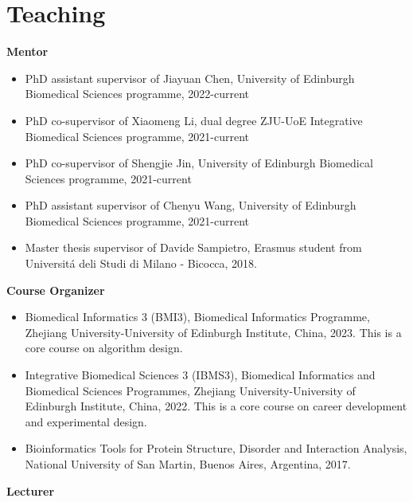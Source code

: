 \documentclass[11pt,a4paper,sans]{moderncv} %
\begin{document}
\section{Teaching}
\vspace{-.1cm}
\textbf{Mentor}
\begin{itemize}
  \item PhD assistant supervisor of Jiayuan Chen, University of Edinburgh Biomedical Sciences programme, 2022-current
  \item PhD co-supervisor of Xiaomeng Li, dual degree ZJU-UoE Integrative Biomedical Sciences programme, 2021-current
  \item PhD co-supervisor of Shengjie Jin, University of Edinburgh Biomedical Sciences programme, 2021-current
  \item PhD assistant supervisor of Chenyu Wang, University of Edinburgh Biomedical Sciences programme, 2021-current
  \item Master thesis supervisor of Davide Sampietro, Erasmus student from Universit\'a deli Studi di Milano - Bicocca, 2018.
\end{itemize}
\vspace{.1cm}
\textbf{Course Organizer}
\begin{itemize}
  \item Biomedical Informatics 3 (BMI3), Biomedical Informatics Programme, Zhejiang University-University of Edinburgh Institute, China, 2023. This is a core course on algorithm design.
  \item Integrative Biomedical Sciences 3 (IBMS3), Biomedical Informatics and Biomedical Sciences Programmes, Zhejiang University-University of Edinburgh Institute, China, 2022. This is a core course on career development and experimental design.
  \item Bioinformatics Tools for Protein Structure, Disorder and Interaction Analysis, National University of San Martin, Buenos Aires, Argentina, 2017.
\end{itemize}
\vspace{.1cm}
\textbf{Lecturer}
\end{document}
